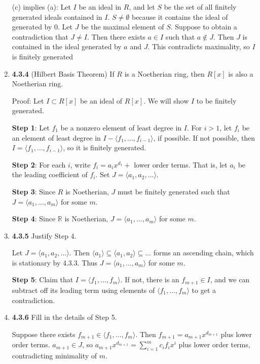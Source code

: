 \documentclass[12pt]{article}
\newcommand{\R}{\mathbb{R}}
\begin{document}
\begin{enumerate}
    (c) implies (a): Let $I$ be an ideal in $R$, and let $S$ be the set of all finitely generated ideals contained in $I$. $S\neq \emptyset$ because it contains the ideal of generated by $0$.  Let $J$ be the maximal element of $S$.  Suppose to obtain a contradiction that $J\neq I$.  Then there exists $a\in I$ such that $a\not\in J$.  Then $J$ is contained in the ideal generated by $a$ and $J$.  This contradicts maximality, so $I$ is finitely generated
    
     \item \textbf{4.3.4} (Hilbert Basis Theorem) If $R$ is a Noetherian ring, then $R[x]$ is also a Noetherian ring.  
     
     Proof:
     Let $I\subset R[x]$ be an ideal of $R[x]$.  We will show $I$ to be finitely generated.  
     
     \textbf{Step 1}: Let $f_1$ be a nonzero element of least degree in $I$.  For $i>1$, let $f_i$ be an element of least degree in $I - \langle f_1, \dots, f_{i-1} \rangle$, if possible.  If not possible, then $I=\langle f_1, \dots, f_{i-1} \rangle$, so it is finitely generated.
     
     \textbf{Step 2}: For each $i$, write $f_i = a_i x^{d_1} +$ lower order terms.  That is, let $a_i$ be the leading coefficient of $f_i$.  Set $J=\langle a_1, a_2, \dots \rangle$.  
     
     \textbf{Step 3}: Since $R$ is Noetherian, $J$ must be finitely generated such that $J=\langle a_1, \dots, a_m \rangle$ for some $m$.
     
     \textbf{Step 4}: Since $\R$ is Noetherian, $J=\langle a_1, \dots, a_m\rangle$ for some $m$.
     
	\item \textbf{4.3.5} Justify Step 4.
	
	Let $J=\langle a_1, a_2, \dots\rangle$.  Then $\langle a_1 \rangle \subseteq \langle a_1,a_2 \rangle \subseteq \dots$ forms an ascending chain, which is stationary by 4.3.3.  Thus $J=\langle a_1, \dots, a_m\rangle$ for some $m$.
     
     \textbf{Step 5}: Claim that $I=\langle f_1, \dots, f_m\rangle$.  If not, there is an $f_{m+1}\in I$, and we can subtract off its leading term using elements of $\langle f_1, \dots, f_m\rangle$ to get a contradiction.  
     
     \item \textbf{4.3.6} Fill in the details of Step 5.
    
    Suppose there exists $f_{m+1}\in \langle f_1, \dots, f_m\rangle$.  
    Then $f_{m+1} = a_{m+1} x^{ d_{m+1} }$ plus lower order terms.
     $a_{m+1}\in J$, so $a_{m+1} x^{ d_{m+1} } = \sum_{i=1}^m c_i f_i x^i$ plus lower order terms, contradicting minimality of $m$.
      

\end{enumerate}
\end{document}
